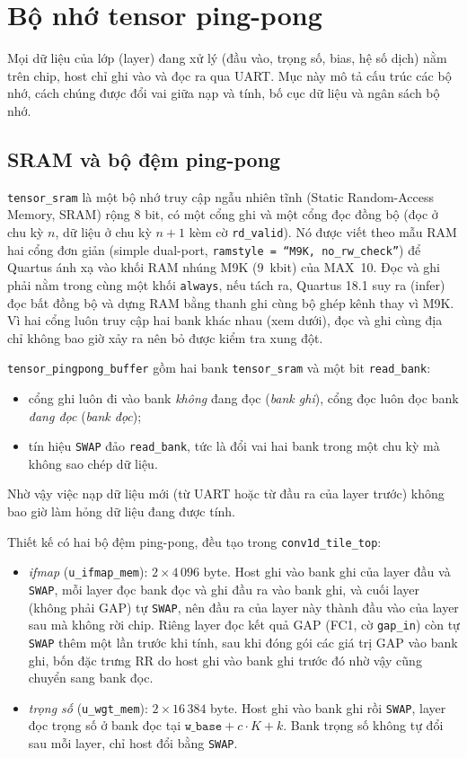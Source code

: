 \section{Bộ nhớ tensor ping-pong}\label{sec:mem}
Mọi dữ liệu của lớp (layer) đang xử lý (đầu vào, trọng số, bias, hệ số dịch) nằm trên chip, host chỉ ghi vào và đọc ra qua UART.
Mục này mô tả cấu trúc các bộ nhớ, cách chúng được đổi vai giữa nạp và tính, bố cục dữ liệu và ngân sách bộ nhớ.

\subsection{SRAM và bộ đệm ping-pong}
\texttt{tensor\_sram} là một bộ nhớ truy cập ngẫu nhiên tĩnh (Static Random-Access Memory, SRAM) rộng $8$ bit, có một cổng ghi và một cổng đọc đồng bộ (đọc ở chu kỳ $n$, dữ liệu ở chu kỳ $n+1$ kèm cờ \texttt{rd\_valid}).
Nó được viết theo mẫu RAM hai cổng đơn giản (simple dual-port, \texttt{ramstyle = ``M9K, no\_rw\_check''}) để Quartus ánh xạ vào khối RAM nhúng M9K ($9$~kbit) của MAX~10.
Đọc và ghi phải nằm trong cùng một khối \texttt{always}, nếu tách ra, Quartus 18.1 suy ra (infer) đọc bất đồng bộ và dựng RAM bằng thanh ghi cùng bộ ghép kênh thay vì M9K.
Vì hai cổng luôn truy cập hai bank khác nhau (xem dưới), đọc và ghi cùng địa chỉ không bao giờ xảy ra nên bỏ được kiểm tra xung đột.

\texttt{tensor\_pingpong\_buffer} gồm hai bank \texttt{tensor\_sram} và một bit \texttt{read\_bank}:
\begin{itemize}
  \item cổng ghi luôn đi vào bank \emph{không} đang đọc (\emph{bank ghi}), cổng đọc luôn đọc bank \emph{đang đọc} (\emph{bank đọc});
  \item tín hiệu \texttt{SWAP} đảo \texttt{read\_bank}, tức là đổi vai hai bank trong một chu kỳ mà không sao chép dữ liệu.
\end{itemize}
Nhờ vậy việc nạp dữ liệu mới (từ UART hoặc từ đầu ra của layer trước) không bao giờ làm hỏng dữ liệu đang được tính.

Thiết kế có hai bộ đệm ping-pong, đều tạo trong \texttt{conv1d\_tile\_top}:
\begin{itemize}
  \item \emph{ifmap} (\texttt{u\_ifmap\_mem}): $2\times4\,096$ byte.
  Host ghi vào bank ghi của layer đầu và \texttt{SWAP}, mỗi layer đọc bank đọc và ghi đầu ra vào bank ghi, và cuối layer (không phải GAP) tự \texttt{SWAP}, nên đầu ra của layer này thành đầu vào của layer sau mà không rời chip.
  Riêng layer đọc kết quả GAP (FC1, cờ \texttt{gap\_in}) còn tự \texttt{SWAP} thêm một lần trước khi tính, sau khi đóng gói các giá trị GAP vào bank ghi, bốn đặc trưng RR do host ghi vào bank ghi trước đó nhờ vậy cũng chuyển sang bank đọc.
  \item \emph{trọng số} (\texttt{u\_wgt\_mem}): $2\times16\,384$ byte.
  Host ghi vào bank ghi rồi \texttt{SWAP}, layer đọc trọng số ở bank đọc tại $\texttt{w\_base}+c\cdot K+k$.
  Bank trọng số không tự đổi sau mỗi layer, chỉ host đổi bằng \texttt{SWAP}.
\end{itemize}

